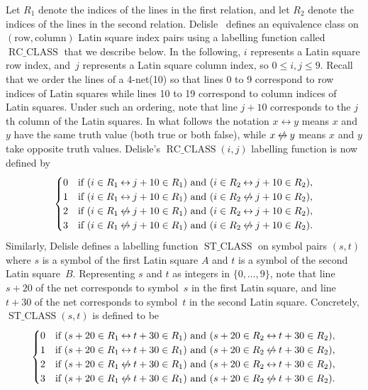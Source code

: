 \documentclass[runningheads]{llncs}
\DeclareMathOperator{\RC}{RC\_CLASS}
\DeclareMathOperator{\ST}{ST\_CLASS}
\newcommand{\liff}{\mathbin\leftrightarrow}
\newcommand{\nliff}{\mathbin{\mspace{2mu}\not\mspace{-2mu}\leftrightarrow}}
\begin{document}
Let $R_1$ denote the indices
of the lines in the first relation, and let $R_2$ denote the indices
of the lines in the second relation.
Delisle~\cite{delisle2010search} defines an equivalence class on $(\text{row}, \text{column})$  Latin square index pairs
using a labelling function called $\RC$ that we describe below.
In the following, $i$ represents
a Latin square row index, and~$j$ represents a Latin square column index, so $0\leq i,j\leq9$.
Recall that we order the lines of a 4-net(10) so that lines 0 to 9 correspond to row indices of Latin squares
while lines 10 to 19 correspond to column indices of Latin squares.
Under such an ordering, note that line $j+10$ corresponds to the $j$th column of the Latin squares.
In what follows
the notation $x\liff y$ means $x$ and $y$ have the same truth value (both
true or both false), while $x\nliff y$ means $x$ and $y$ take opposite truth values.
Delisle's $\RC(i,j)$ labelling function is now defined by
\begin{equation}
\begin{cases}
0 & \text{if ($i\in R_1\liff j+10\in R_1$) and ($i\in R_2\liff j+10\in R_2$)}, \\
1 & \text{if ($i\in R_1\liff j+10\in R_1$) and ($i\in R_2\nliff j+10\in R_2$)}, \\
2 & \text{if ($i\in R_1\nliff j+10\in R_1$) and ($i\in R_2\liff j+10\in R_2$)}, \\
3 & \text{if ($i\in R_1\nliff j+10\in R_1$) and ($i\in R_2\nliff j+10\in R_2$)}.
\end{cases}
\end{equation}
Similarly, Delisle defines a labelling function $\ST$ on symbol pairs
$(s,t)$ where $s$ is a symbol of the first Latin square $A$ and $t$ is a symbol of the second Latin
square~$B$.
Representing $s$ and $t$ as integers in $\{0,\dotsc,9\}$,
note that line $s+20$ of the net corresponds to symbol~$s$ in the first Latin square,
and line $t+30$ of the net corresponds to symbol~$t$ in the second Latin square.
Concretely, $\ST(s,t)$ is defined
to be
\begin{equation}
\begin{cases}
0 & \text{if ($s+20\in R_1\liff t+30\in R_1$) and ($s+20\in R_2\liff t+30\in R_2$)}, \\
1 & \text{if ($s+20\in R_1\liff t+30\in R_1$) and ($s+20\in R_2\nliff t+30\in R_2$)}, \\
2 & \text{if ($s+20\in R_1\nliff t+30\in R_1$) and ($s+20\in R_2\liff t+30\in R_2$)}, \\
3 & \text{if ($s+20\in R_1\nliff t+30\in R_1$) and ($s+20\in R_2\nliff t+30\in R_2$)}.
\end{cases}
\end{equation}
\end{document}
